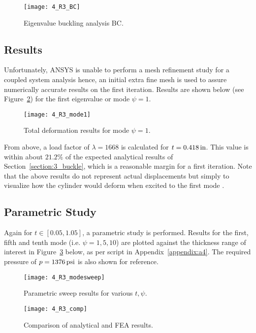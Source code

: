 \begin{figure}[H]
	\centering
	\texttt{[image: 4\_R3\_BC]}
	\caption{Eigenvalue buckling analysis BC.}
	\label{fig:4_R3_BC}
\end{figure}

\subsection{Results}

Unfortunately, ANSYS is unable to perform a mesh refinement study for a coupled system analysis hence, an initial extra fine mesh is used to assure numerically accurate results on the first iteration. Results are shown below (see Figure~\ref{fig:4_R3_mode1}) for the first eigenvalue or mode $\psi = 1$.
\begin{figure}[H]
	\centering
	\texttt{[image: 4\_R3\_mode1]}
	\caption{Total deformation results for mode $\psi = 1$.}
	\label{fig:4_R3_mode1}
\end{figure}

From above, a load factor of $\lambda = 1668$ is calculated for $t= 0.418\,\mathrm{in}$. This value is within about $21.2\%$ of the expected analytical results of Section~\ref{section:3_buckle}, which is a reasonable margin for a first iteration. Note that the above results do not represent actual displacements but simply to visualize how the cylinder would deform when excited to the first mode \cite{ANSYS}.

\subsection{Parametric Study}

Again for $t\in [0.05, 1.05]$, a parametric study is performed. Results for the first, fifth and tenth mode (i.e. $\psi = 1, 5, 10$) are plotted against the thickness range of interest in Figure~\ref{fig:4_R3_modesweep} below, as per \cite{PYTHON} script in Appendix~\ref{appendix:a4}. The required pressure of $p =1376\,\mathrm{psi}$ is also shown for reference.

\begin{figure}[H]
	\centering
	\texttt{[image: 4\_R3\_modesweep]}
	\caption{Parametric sweep results for various $t, \psi$.}
	\label{fig:4_R3_modesweep}
\end{figure}

\begin{figure}[H]
	\centering
	\texttt{[image: 4\_R3\_comp]}
	\caption{Comparison of analytical and FEA results.}
	\label{fig:4_R3_comp}
\end{figure}

